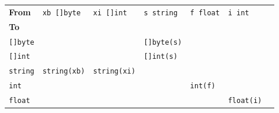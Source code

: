 \begin{tabular}{lllllll}
\textbf{From}	 &  \verb|xb []byte|	    & \verb|xi []int| & \verb|s string|     &	\verb|f float|  &  \verb|i int|	\\ \cmidrule(r){1-6}
\textbf{To}	 &				    &		    &			    &			& \\ \cmidrule(r){1-1}
\verb|[]byte|    &				    &		    & \verb|[]byte(s)|	    &			& \\
\verb|[]int|     &				    &		    & \verb|[]int(s)|	    &			& \\
\verb|string|    &		  \verb|string(xb)| &\verb|string(xi)|	    &		    &			& \\
\verb|int|	 &				    &		    &			    & \verb|int(f)|	& \\
\verb|float|	 &				    &		    &			    &			& \verb|float(i)| \\
\end{tabular}
